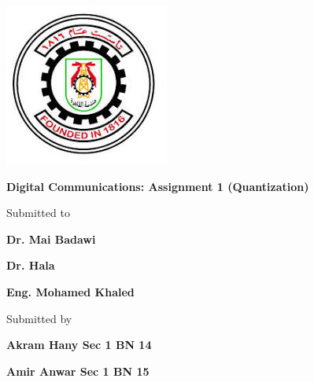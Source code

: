 \documentclass{article}
\begin{document}
\begin{titlepage}
\begin{center}
\begin{minipage}[c]{0.15\textwidth}
            \includegraphics[width=\textwidth]{CUFE.jpeg}
        \end{minipage}
    \end{center}
    
    \noindent\hrulefill
    
    \vspace{2cm}
    
    \begin{center}
        {\Huge \textbf{Digital Communications: Assignment 1 (Quantization)}\par}
        \vspace{1.5cm}

        {\large Submitted to\par}
        {\Large \textbf{Dr. Mai Badawi }\par}
        {\Large \textbf{Dr. Hala }\par}
        {\Large \textbf{Eng. Mohamed Khaled }\par}
        \vspace{1cm}
        
        {\large Submitted by\par}
        {\Large \textbf{Akram Hany Sec 1 BN 14 }\par}
        {\Large \textbf{Amir Anwar Sec 1 BN 15 }\par}
        \vspace{1cm}
        
    \end{center}
    
    \vfill
    
\end{titlepage}
\end{document}

